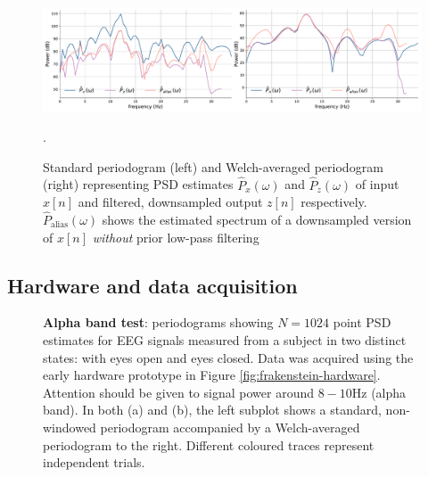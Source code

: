 \begin{figure}[h]
    \centering
    \includegraphics[width=\textwidth]{sq_wave_filtering_ds_spectra}
    \caption[PSD estimates of an input signal, filtered and downsampled version and a downsampled version without filtering.]{Standard periodogram (left) and Welch-averaged periodogram (right) representing PSD estimates $\hat{P}_x(\omega)$ and $\hat{P}_z(\omega)$ of input $x[n]$ and filtered, downsampled output $z[n]$ respectively. $\hat{P}_{\text{alias}}(\omega)$ shows the estimated spectrum of a downsampled version of $x[n]$ \textit{without} prior low-pass filtering}.
    \label{fig:sq-wave-ds-spectra-c6}
\end{figure}

\subsection{Hardware and data acquisition}

\begin{figure}[htp]

\caption[\textbf{Alpha band test}: periodograms showing $N=1024$ point PSD estimates for EEG signals measured from a subject in two distinct states: with eyes open and eyes closed.]{\textbf{Alpha band test}: periodograms showing $N=1024$ point PSD estimates for EEG signals measured from a subject in two distinct states: with eyes open and eyes closed. Data was acquired using the early hardware prototype in Figure \ref{fig:frakenstein-hardware}. Attention should be given to signal power around $8-10$Hz (alpha band). In both (a) and (b), the left subplot shows a standard, non-windowed periodogram accompanied by a Welch-averaged periodogram to the right. Different coloured traces represent independent trials.}
\end{figure}


